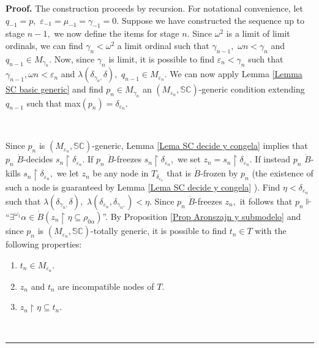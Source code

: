 \documentclass{article}
\newenvironment{proof}[1][Proof]{\noindent\textbf{#1.} }{\ \rule{0.5em}{0.5em}}
\begin{document}
\begin{proof}
The construction proceeds by recursion. For notational convenience, let
$q_{-1}=p,$ $\varepsilon_{-1}=\mu_{-1}=\gamma_{-1}=0.$ Suppose we have
constructed the sequence up to stage $n-1,$ we now define the items for stage
$n.$ Since $\omega^{2}$ is a limit of limit ordinals, we can find $\gamma
_{n}<\omega^{2}$ a limit ordinal such that $\gamma_{n-1},$ $\omega
n<\gamma_{n}$ and $q_{n-1}\in M_{\gamma_{n}}.$ Now, since $\gamma_{n}$ is
limit, it is possible to find $\varepsilon_{n}<\gamma_{n}$ such that
$\gamma_{n-1},\omega n<\varepsilon_{n}$ and $\lambda\left(  \delta_{\gamma
_{n},}\delta\right)  ,$ $q_{n-1}\in M_{\varepsilon_{n}}.$ We can now apply
Lemma \ref{Lemma SC basic generic} and find $p_{n}\in M_{\gamma_{n}}$ an
$(M_{\varepsilon_{n}},\mathbb{SC})$-generic condition extending $q_{n-1}$ such
that \textsf{max}$\left(  p_{n}\right)  =\delta_{\varepsilon_{n}}.$

\qquad\qquad\qquad\ \ \ \ 

Since $p_{n}$ is $(M_{\varepsilon_{n}},\mathbb{SC})$-generic, Lemma
\ref{Lema SC decide y congela} implies that $p_{n}$ $\dot{B}$-decides
$s_{n}\upharpoonright\delta_{\varepsilon_{n}}.$ If $p_{n}$ $\dot{B}$-freezes
$s_{n}\upharpoonright\delta_{\varepsilon_{n}},$ we set $z_{n}=s_{n}%
\upharpoonright\delta_{\varepsilon_{n}}.$ If instead $p_{n}$ $\dot{B}$-kills
$s_{n}\upharpoonright\delta_{\varepsilon_{n}},$ we let $z_{n}$ be any node in
$T_{\delta_{\varepsilon_{n}}}$ that is $\dot{B}$-frozen by $p_{n}$ (the
existence of such a node is guaranteed by Lemma \ref{Lema SC decide y congela}%
). Find $\eta<\delta_{\varepsilon_{n}}$ such that $\lambda\left(
\delta_{\gamma_{n},}\delta\right)  ,$ $\lambda\left(  \delta_{\varepsilon_{n}%
},\delta_{\gamma_{n},}\right)  <\eta.$ Since $p_{n}$ $\dot{B}$-freezes
$z_{n},$ it follows that $p_{n}\Vdash$\textquotedblleft$\exists^{\omega_{1}%
}\alpha\in\dot{B}\left(  z_{n}\upharpoonright\eta\subseteq\rho_{0\alpha
}\right)  $\textquotedblright. By Proposition \ref{Prop Aronszajn y submodelo}
and since $p_{n}$ is $(M_{\varepsilon_{n}},\mathbb{SC})$-totally generic, it
is possible to find $t_{n}\in T$ with the following properties:

\begin{enumerate}
\item $t_{n}\in M_{\varepsilon_{n}}.$

\item $z_{n}$ and $t_{n}$ are incompatible nodes of $T.$

\item $z_{n}\upharpoonright\eta\subseteq t_{n}.$


\end{enumerate}
\end{proof}
\end{document}
